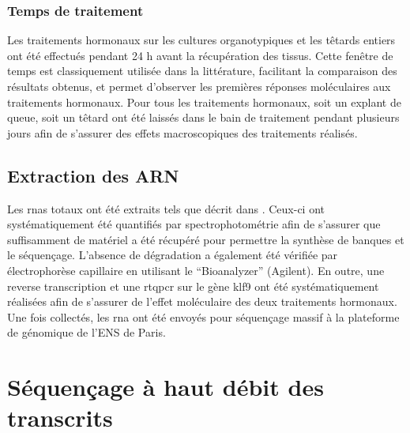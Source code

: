 \documentclass[../main.tex]{subfiles}
\begin{document}
		\subsubsection{Temps de traitement}
			Les traitements hormonaux sur les cultures organotypiques et les têtards entiers ont été effectués pendant 24 h avant la récupération des tissus.
			Cette fenêtre de temps est classiquement utilisée dans la littérature, facilitant la comparaison des résultats obtenus, et permet d'observer les premières réponses moléculaires aux traitements hormonaux.
			Pour tous les traitements hormonaux, soit un explant de queue, soit un têtard ont été laissés dans le bain de traitement pendant plusieurs jours afin de s'assurer des effets macroscopiques des traitements réalisés.


	\subsection{Extraction des ARN}
		Les \glspl{rna} totaux ont été extraits tels que décrit dans \citet{Bilesimo2011}.
		Ceux-ci ont systématiquement été quantifiés par spectrophotométrie afin de s'assurer que suffisamment de matériel a été récupéré pour permettre la synthèse de banques et le séquençage.
		L'absence de dégradation a également été vérifiée par électrophorèse capillaire en utilisant le ``Bioanalyzer'' (Agilent).
		En outre, une reverse transcription et une \gls{rtqpcr} sur le gène \gls{klf9} ont été systématiquement réalisées afin de s'assurer de l'effet moléculaire des deux traitements hormonaux.
		Une fois collectés, les \gls{rna} ont été envoyés pour séquençage massif à la plateforme de génomique de l'ENS de Paris.




\section{Séquençage à haut débit des transcrits}
\end{document}
